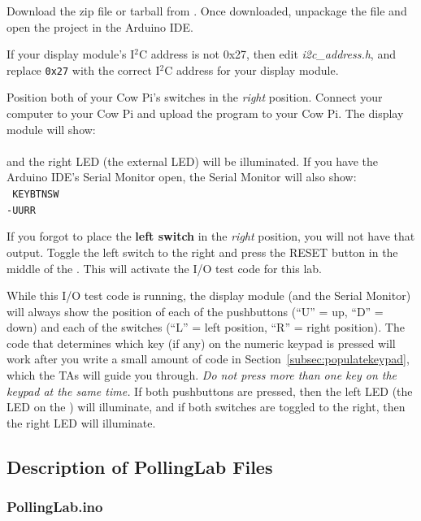 Download the zip file or tarball from \filesource.
Once downloaded, unpackage the file and open the project in the Arduino IDE\@.

If your display module's I$^2$C address is not 0x27, then edit \textit{i2c\_address.h}, and replace \lstinline{0x27} with the correct I$^2$C address for your display module.

Position both of your Cow Pi's switches in the \textit{right} position.
Connect your computer to your Cow Pi and upload the program to your Cow Pi.
The display module will show: \\
 \\
and the right LED (the external LED) will be illuminated.
If you have the Arduino IDE's Serial Monitor open, the Serial Monitor will also show: \\
\texttt{
    KEY\phantom{xxx}BTN\phantom{xxx}SW \\
    \phantom{x}-\phantom{xxxx}U\phantom{x}U\phantom{xxx}R\phantom{x}R
}

If you forgot to place the \textbf{left switch} in the \textit{right} position, you will not have that output.
Toggle the left switch to the right and press the RESET button in the middle of the \developmentboard.
This will activate the I/O test code for this lab.

While this I/O test code is running, the display module (and the Serial Monitor) will always show the position of each of the pushbuttons (``U'' = up, ``D'' = down) and each of the switches (``L'' = left position, ``R'' = right position).
The code that determines which key (if any) on the numeric keypad is pressed will work after you write a small amount of code in Section~\ref{subsec:populatekeypad}, which the TAs will guide you through.
\textit{Do not press more than one key on the keypad at the same time.}
If both pushbuttons are pressed, then the left LED (the LED on the \developmentboard) will illuminate,
and if both switches are toggled to the right, then the right LED will illuminate.


\subsection{Description of PollingLab Files}

\subsubsection{PollingLab.ino}


